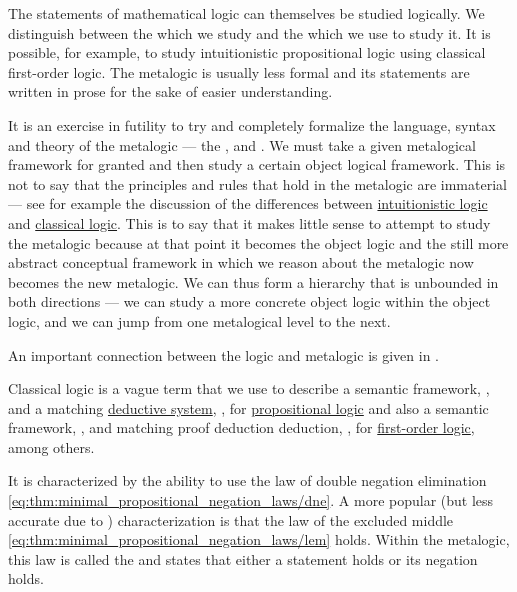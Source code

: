 \begin{remark}\label{rem:metalogic}
  The statements of mathematical logic can themselves be studied logically. We distinguish between the  which we study and the  which we use to study it. It is possible, for example, to study intuitionistic propositional logic using classical first-order logic. The metalogic is usually less formal and its statements are written in prose for the sake of easier understanding.

  It is an exercise in futility to try and completely formalize the language, syntax and theory of the metalogic --- the ,  and . We must take a given metalogical framework for granted and then study a certain object logical framework. This is not to say that the principles and rules that hold in the metalogic are immaterial --- see for example the discussion of the differences between \hyperref[def:intuitionistic_logic]{intuitionistic logic} and \hyperref[def:classical_logic]{classical logic}. This is to say that it makes little sense to attempt to study the metalogic because at that point it becomes the object logic and the still more abstract conceptual framework in which we reason about the metalogic now becomes the new metalogic. We can thus form a hierarchy that is unbounded in both directions --- we can study a more concrete object logic within the object logic, and we can jump from one metalogical level to the next.

  An important connection between the logic and metalogic is given in .
\end{remark}

\begin{definition}\label{def:classical_logic}
  Classical logic is a vague term that we use to describe a semantic framework, , and a matching \hyperref[def:deductive_system]{deductive system}, , for \hyperref[subsec:propositional_logic]{propositional logic} and also a semantic framework, , and matching proof deduction deduction, , for \hyperref[subsec:first_order_logic]{first-order logic}, among others.

  It is characterized by the ability to use the law of double negation elimination \eqref{eq:thm:minimal_propositional_negation_laws/dne}. A more popular (but less accurate due to ) characterization is that the law of the excluded middle \eqref{eq:thm:minimal_propositional_negation_laws/lem} holds. Within the metalogic, this law is called the  and states that either a statement holds or its negation holds.
\end{definition}

